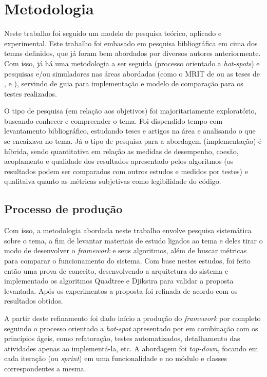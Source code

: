 \chapter[Metodologia]{Metodologia}

Neste trabalho foi seguido um modelo de pesquisa teórico, aplicado e experimental. Este trabalho foi embasado em pesquisa bibliográfica em cima dos temas definidos, que já foram bem abordados por diversos autores anteriormente. Com isso, já há uma metodologia a ser seguida (processo orientado a \textit{hot-spots}) e pesquisas e/ou simuladores nas áreas abordadas (como o MRIT de \cite{Guzman2008} ou as teses de \cite{Souza2008}, \cite{Thomsen2010} e \cite{Strandberg2004}), servindo de guia para implementação e modelo de comparação para os testes realizados.

O tipo de pesquisa (em relação aos objetivos) foi majoritariamente exploratório, buscando conhecer e compreender o tema. Foi dispendido tempo com levantamento bibliográfico, estudando teses e artigos na área e analisando o que se encaixava no tema. Já o tipo de pesquisa para a abordagem (implementação) é híbrida, sendo quantitativa em relação as medidas de desempenho, coesão, acoplamento e qualidade dos resultados apresentado pelos algorítmos (os resultados podem ser comparados com outros estudos e medidos por testes) e qualitaiva quanto as métricas subjetivas como legibilidade do código.

\section{Processo de produção}

Com isso, a metodologia abordada neste trabalho envolve pesquisa sistemática sobre o tema, a fim de levantar materiais de estudo ligados ao tema e deles tirar o modo de desenvolver o \textit{framework} e seus algoritmos, além de buscar métricas para comparar o funcionamento do sistema. Com base nestes estudos, foi feito então uma prova de conceito, desenvolvendo a arquitetura do sistema e implementado os algoritmos Quadtree e Djikstra para validar a proposta levantada. Após os experimentos a proposta foi refinada de acordo com os resultados obtidos.

A partir deste refinamento foi dado início a produção do \textit{framework} por completo seguindo o processo orientado a \textit{hot-spot} apresentado por \cite{Fayad1999} em combinação com os princípios ágeis, como refatoração, testes automatizados, detalhamento das atividades apenas ao implementá-la, etc. A abordagem foi \textit{top-down}, focando em cada iteração (ou \textit{sprint}) em uma funcionalidade e no módulo e classes correspondentes a mesma. 

